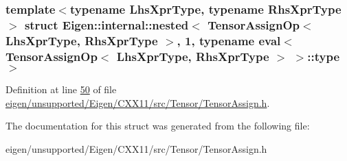 \subsubsection*{template$<$typename Lhs\+Xpr\+Type, typename Rhs\+Xpr\+Type$>$\newline
struct Eigen\+::internal\+::nested$<$ Tensor\+Assign\+Op$<$ Lhs\+Xpr\+Type, Rhs\+Xpr\+Type $>$, 1, typename eval$<$ Tensor\+Assign\+Op$<$ Lhs\+Xpr\+Type, Rhs\+Xpr\+Type $>$ $>$\+::type $>$}



Definition at line \hyperlink{eigen_2unsupported_2_eigen_2_c_x_x11_2src_2_tensor_2_tensor_assign_8h_source_l00050}{50} of file \hyperlink{eigen_2unsupported_2_eigen_2_c_x_x11_2src_2_tensor_2_tensor_assign_8h_source}{eigen/unsupported/\+Eigen/\+C\+X\+X11/src/\+Tensor/\+Tensor\+Assign.\+h}.



The documentation for this struct was generated from the following file\+:\begin{DoxyCompactItemize}
\item 
eigen/unsupported/\+Eigen/\+C\+X\+X11/src/\+Tensor/\+Tensor\+Assign.\+h\end{DoxyCompactItemize}
